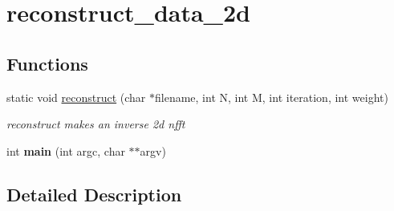 \hypertarget{group__applications__mri2d__reconstruct__data__2d}{\section{reconstruct\-\_\-data\-\_\-2d}
\label{group__applications__mri2d__reconstruct__data__2d}
}
\subsection*{Functions}
\begin{DoxyCompactItemize}
\item 
\hypertarget{group__applications__mri2d__reconstruct__data__2d_ga75582a0ebe96f1391e90db0053ee981c}{static void \hyperlink{group__applications__mri2d__reconstruct__data__2d_ga75582a0ebe96f1391e90db0053ee981c}{reconstruct} (char $\ast$filename, int N, int M, int iteration, int weight)}\label{group__applications__mri2d__reconstruct__data__2d_ga75582a0ebe96f1391e90db0053ee981c}

\begin{DoxyCompactList}\small\item\em reconstruct makes an inverse 2d nfft \end{DoxyCompactList}\item 
\hypertarget{group__applications__mri2d__reconstruct__data__2d_ga3c04138a5bfe5d72780bb7e82a18e627}{int {\bfseries main} (int argc, char $\ast$$\ast$argv)}\label{group__applications__mri2d__reconstruct__data__2d_ga3c04138a5bfe5d72780bb7e82a18e627}

\end{DoxyCompactItemize}


\subsection{Detailed Description}
